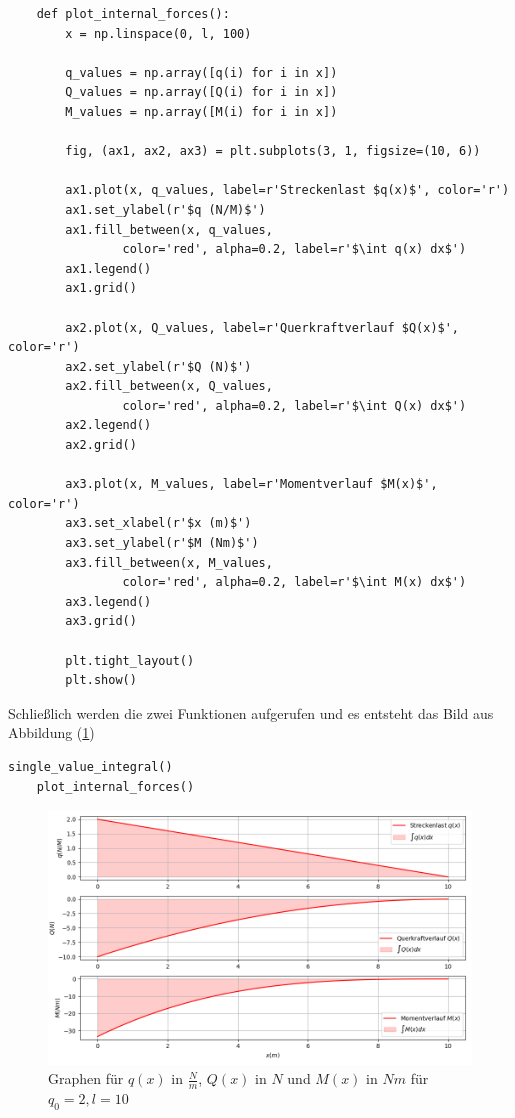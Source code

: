 \begin{lstlisting}
    def plot_internal_forces():
        x = np.linspace(0, l, 100)
    
        q_values = np.array([q(i) for i in x])
        Q_values = np.array([Q(i) for i in x])
        M_values = np.array([M(i) for i in x])
    
        fig, (ax1, ax2, ax3) = plt.subplots(3, 1, figsize=(10, 6))
    
        ax1.plot(x, q_values, label=r'Streckenlast $q(x)$', color='r')
        ax1.set_ylabel(r'$q (N/M)$')
        ax1.fill_between(x, q_values,
                color='red', alpha=0.2, label=r'$\int q(x) dx$')
        ax1.legend()
        ax1.grid()
    
        ax2.plot(x, Q_values, label=r'Querkraftverlauf $Q(x)$', color='r')
        ax2.set_ylabel(r'$Q (N)$')
        ax2.fill_between(x, Q_values,
                color='red', alpha=0.2, label=r'$\int Q(x) dx$')
        ax2.legend()
        ax2.grid()
    
        ax3.plot(x, M_values, label=r'Momentverlauf $M(x)$', color='r')
        ax3.set_xlabel(r'$x (m)$')
        ax3.set_ylabel(r'$M (Nm)$')
        ax3.fill_between(x, M_values,
                color='red', alpha=0.2, label=r'$\int M(x) dx$')
        ax3.legend()
        ax3.grid()
    
        plt.tight_layout()
        plt.show()
\end{lstlisting}

Schließlich werden die zwei Funktionen aufgerufen und es entsteht das Bild aus Abbildung (\ref{fig:InternalForcesPlot})

\begin{lstlisting}[language=Python]
    single_value_integral()
    plot_internal_forces()
\end{lstlisting}

\begin{figure}[h]
    \centering
    \includegraphics[width=\textwidth]{images/internal_forces_plot.png}
    \caption{Graphen für $q(x)$ in $\frac{N}{m}$, $Q(x)$ in $N$ und $M(x)$ in $Nm$ für $q_0=2, l=10$}
    \label{fig:InternalForcesPlot}
\end{figure}

